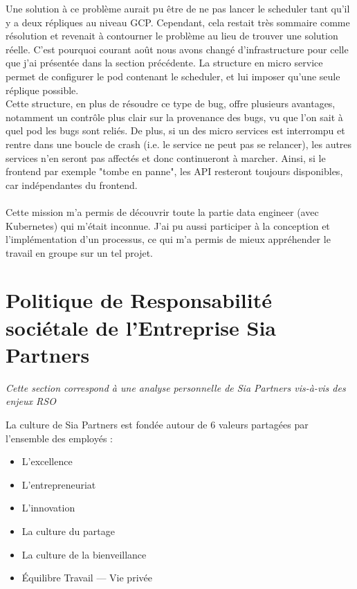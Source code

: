 \documentclass{article} %
\begin{document}
{Une solution à ce problème aurait pu être de ne pas lancer le scheduler tant qu'il y a deux répliques au niveau GCP. Cependant, cela restait très sommaire comme résolution et revenait à contourner le problème au lieu de trouver une solution réelle. C'est pourquoi courant août nous avons changé d'infrastructure pour celle que j'ai présentée dans la section précédente. La structure en micro service permet de configurer le pod contenant le scheduler, et lui imposer qu'une seule réplique possible.\\

Cette structure, en plus de résoudre ce type de bug, offre plusieurs avantages, notamment un contrôle plus clair sur la provenance des bugs, vu que l'on sait à quel pod les bugs sont reliés. De plus, si un des micro services est interrompu et rentre dans une boucle de crash (i.e. le service ne peut pas se relancer), les autres services n'en seront pas affectés et donc continueront à marcher. Ainsi, si le frontend par exemple "tombe en panne", les API resteront toujours disponibles, car indépendantes du frontend.\\ \\

Cette mission m'a permis de découvrir toute la partie data engineer (avec Kubernetes) qui m'était inconnue. J'ai pu aussi participer à la conception et l'implémentation d'un processus, ce qui m'a permis de mieux appréhender le travail en groupe sur un tel projet.


\newpage

\section{Politique de Responsabilité sociétale de l’Entreprise Sia Partners}
\textit{Cette section correspond à une analyse personnelle de Sia Partners vis-à-vis des enjeux RSO}

La culture de Sia Partners est fondée autour de 6 valeurs partagées par l’ensemble des employés :
\begin{itemize}
 \item L’excellence
 \item L'entrepreneuriat
 \item L’innovation
 \item La culture du partage
 \item La culture de la bienveillance
 \item Équilibre Travail — Vie privée
\end{itemize}

}
\end{document}

